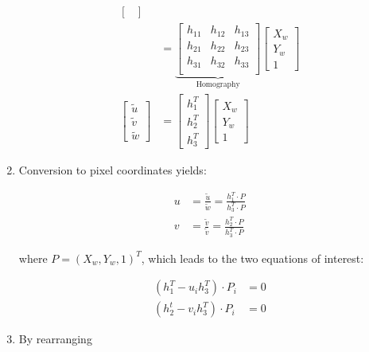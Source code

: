 \documentclass[10pt,a4paper]{scrartcl}
\begin{document}
\begin{multicols*}{2}
\begin{enumerate}
\begin{align*}
\begin{bmatrix}
\end{bmatrix}\\
&=\underbrace{\begin{bmatrix}
h_{11}&h_{12}&h_{13}\\
h_{21}&h_{22}&h_{23}\\
h_{31}&h_{32}&h_{33}\\
\end{bmatrix}}_{\text{Homography}}\begin{bmatrix}
X_w\\Y_w\\1
\end{bmatrix}\\
\begin{bmatrix}
\tilde{u}\\\tilde{v}\\\tilde{w}
\end{bmatrix}&=\begin{bmatrix}
h_1^T\\h_2^T\\h_3^T
\end{bmatrix}
\begin{bmatrix}
X_w\\Y_w\\1
\end{bmatrix}
\end{align*}

\item Conversion to pixel coordinates yields:

\begin{align*}
u&=\frac{\tilde{u}}{\tilde{w}}=\frac{h_1^T\cdot P}{h_3^T\cdot P}\\
v&=\frac{\tilde{v}}{\tilde{v}}=\frac{h_2^T\cdot P}{h_3^T\cdot P}
\end{align*}

where $P=(X_w,Y_w,1)^T$, which leads to the two equations of interest:

\begin{align*}
(h_1^T-u_ih_3^T)\cdot P_i&=0\\
(h_2^t-v_ih_3^T)\cdot P_i&=0
\end{align*}

\item By rearranging


\end{enumerate}
\end{multicols*}
\end{document}
